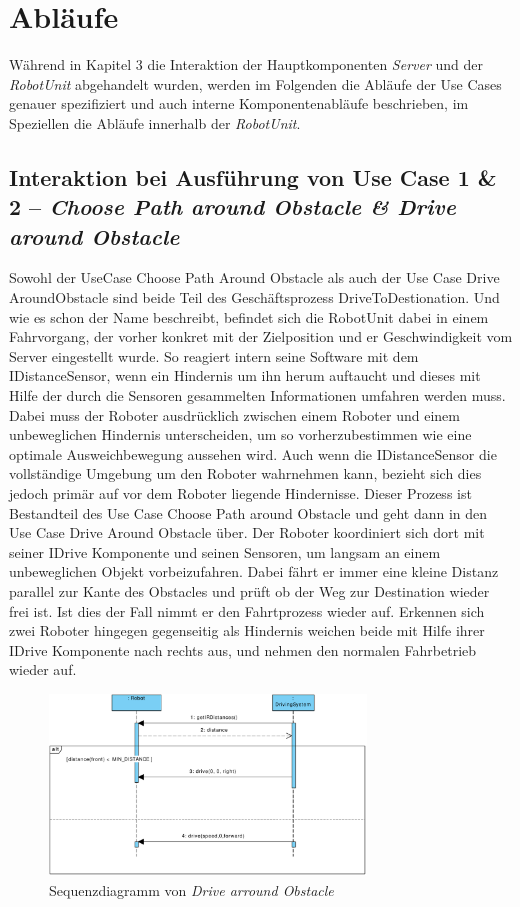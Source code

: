 \section{Abläufe}

Während in Kapitel 3 die Interaktion der Hauptkomponenten \emph{Server} und der \emph{RobotUnit} abgehandelt wurden, werden im Folgenden die Abläufe der Use Cases genauer spezifiziert und auch interne Komponentenabläufe beschrieben, im Speziellen die Abläufe innerhalb der \emph{RobotUnit}.
	
	\subsection*{Interaktion bei Ausführung von Use Case 1 & 2 – \emph{Choose Path around Obstacle & Drive around Obstacle}}
	Sowohl der UseCase Choose Path Around Obstacle als auch der Use Case Drive AroundObstacle sind beide Teil des Geschäftsprozess DriveToDestionation.  Und wie es schon der Name beschreibt, befindet sich die RobotUnit dabei in einem Fahrvorgang, der vorher konkret mit der Zielposition und er Geschwindigkeit vom Server eingestellt wurde. So reagiert intern seine Software mit dem IDistanceSensor, wenn ein Hindernis um ihn herum auftaucht und dieses mit Hilfe der durch die Sensoren gesammelten Informationen umfahren werden muss. Dabei muss der Roboter ausdrücklich zwischen einem Roboter und einem unbeweglichen Hindernis unterscheiden, um so vorherzubestimmen wie eine optimale Ausweichbewegung aussehen wird. Auch wenn die IDistanceSensor die vollständige Umgebung um den Roboter wahrnehmen kann, bezieht sich dies jedoch primär auf vor dem Roboter liegende Hindernisse. Dieser Prozess ist Bestandteil des Use Case Choose Path around Obstacle und geht dann in den Use Case Drive Around Obstacle über. Der Roboter koordiniert sich dort mit seiner IDrive Komponente und seinen Sensoren, um langsam an einem unbeweglichen Objekt vorbeizufahren. Dabei fährt er immer eine kleine Distanz parallel zur Kante des Obstacles und prüft ob der Weg zur Destination wieder frei ist. Ist dies der Fall nimmt er den Fahrtprozess wieder auf. Erkennen sich zwei Roboter hingegen gegenseitig als Hindernis weichen beide mit Hilfe ihrer IDrive Komponente nach rechts aus, und nehmen den normalen Fahrbetrieb wieder auf. \\
	\begin{figure}[H]
		\centering
		\includegraphics[width=0.75\textwidth]{img/1-Entwurf-8-DriveArroundObstacle}
		\caption{Sequenzdiagramm von \emph{Drive arround Obstacle}}
		\label{Umfahren von statichen Objekten}
	\end{figure}
	

